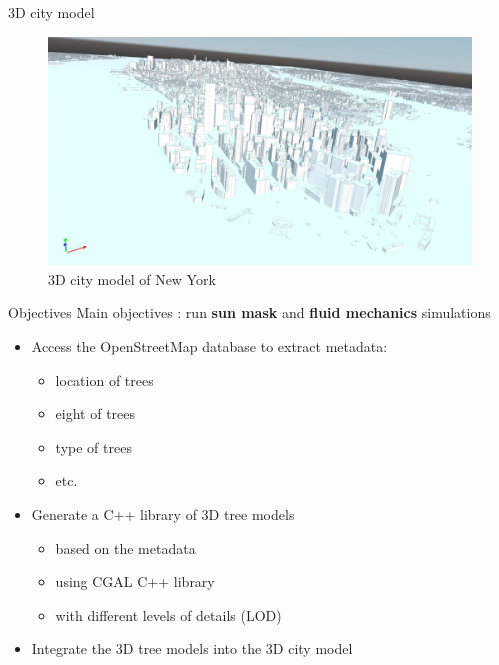 \documentclass[10pt]{beamer}
\begin{document}
\begin{frame}{3D city model}
  \begin{figure}[h] %
    \centering
    \includegraphics[width=1\textwidth]{images/NY_mesh.png}
    \caption{3D city model of New York\cite{img:NY} } %
    \label{fig:city_model} %
  \end{figure} 
\end{frame}

\begin{frame}{Objectives}
  Main objectives : run \textbf{sun mask} and \textbf{fluid mechanics} simulations \\
  \vspace{0.5cm}

  \begin{itemize}
    \item<2-> Access the OpenStreetMap\cite{overpass} database to extract metadata:
    \begin{itemize}
      \item<3-> location of trees
      \item<4-> eight of trees
      \item <5-> type of trees
      \item <6-> etc.
    \end{itemize}
    \item<7-> Generate a C++ library of 3D tree models
    \begin{itemize}
      \item <8-> based on the metadata
      \item <9-> using CGAL\cite{cgal} C++ library 
      \item <10-> with different levels of details (LOD)
    \end{itemize}
    \item<11-> Integrate the 3D tree models into the 3D city model
  \end{itemize} 
\end{frame}
\end{document}
